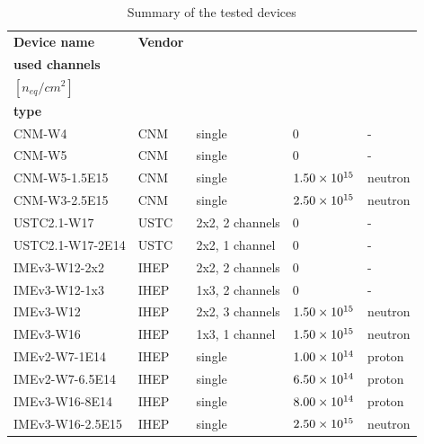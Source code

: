 \begin{table}[!ht]
    \centering
    \caption{Summary of the tested devices}
    \label{tab:devices_tested}

    \begin{tabularx}{.77\textwidth}{|l|l|l|l|X|}
    \hline %
        \textbf{Device name} & \textbf{Vendor} & \begin{tabular}{@{}l@{}}\textbf{Pads,} \\ \textbf{used channels}\end{tabular} & \begin{tabular}{@{}l@{}}\textbf{Fluence} \\ $[n_{eq}/\si{cm^2}]$ \end{tabular} & \begin{tabular}{@{}l@{}} \textbf{Radiation} \\ \textbf{type} \end{tabular} \\
        \hline
        CNM-W4  & CNM & single & 0 & -  \\ 
        CNM-W5  & CNM & single & 0 & -  \\ 
        CNM-W5-1.5E15  & CNM & single & $\num{1.50E+15}$ & neutron  \\ 
        CNM-W3-2.5E15  & CNM & single & $\num{2.50E+15}$ & neutron  \\ 
        USTC2.1-W17 & USTC & 2x2, 2 channels  & 0 & -  \\ 
        USTC2.1-W17-2E14 & USTC & 2x2, 1 channel & 0 & - \\ 
        IMEv3-W12-2x2  & IHEP & 2x2, 2 channels  & 0 & -  \\ 
        IMEv3-W12-1x3  & IHEP & 1x3, 2 channels  & 0 & -  \\ 
        IMEv3-W12  & IHEP & 2x2, 3 channels  & $\num{1.50E+15}$ & neutron  \\ 
        IMEv3-W16  & IHEP & 1x3, 1 channel  & $\num{1.50E+15}$ & neutron  \\ 
        IMEv2-W7-1E14  & IHEP & single & $\num{1.00E+14}$ & proton  \\ 
        IMEv2-W7-6.5E14  & IHEP & single & $\num{6.50E+14}$ & proton  \\ 
        IMEv3-W16-8E14  & IHEP & single & $\num{8.00E+14}$ & proton  \\
        IMEv3-W16-2.5E15  & IHEP & single & $\num{2.50E+15}$ & neutron  \\ 
        \hline
    \end{tabularx}
\end{table}